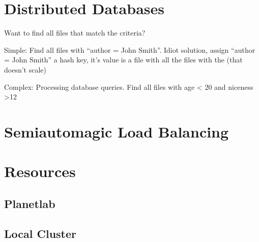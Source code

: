 \documentclass[10pt,letterpaper,twoside]{report}
\begin{document}
\section{Distributed Databases}


Want to find all files that match the criteria?

Simple: Find all files with ``author = John Smith''.  Idiot solution, assign ``author = John Smith'' a hash key,  it's value is a file with all the files with the (that doesn't scale) 


Complex: Processing database queries.   Find all files with age < 20 and niceness >12


\section{Semiautomagic Load Balancing}

\section{Resources}
\subsection{Planetlab}
\subsection{Local Cluster}





\end{document}
